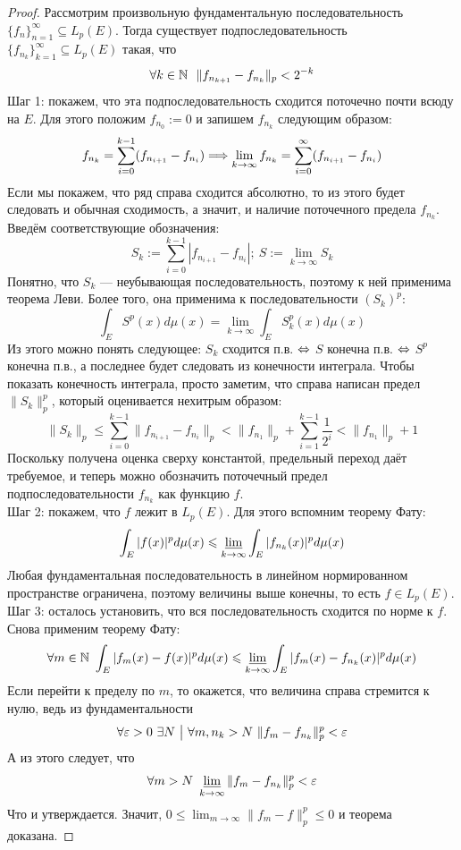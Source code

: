\begin{proof}
	Рассмотрим произвольную фундаментальную последовательность $\{f_n\}_{n = 1}^\infty \subseteq L_p(E)$. Тогда существует подпоследовательность $\{f_{n_k}\}_{k = 1}^\infty \subseteq L_p(E)$ такая, что
	\[
		\forall k \in \N\ \ \|f_{n_{k + 1}} - f_{n_k}\|_p < 2^{-k}
	\]
	Шаг 1: покажем, что эта подпоследовательность сходится поточечно почти всюду на $E$. Для этого положим $f_{n_0} := 0$ и запишем $f_{n_k}$ следующим образом:
	\[
		f_{n_k} = \sum_{i = 0}^{k - 1} (f_{n_{i + 1}} - f_{n_i}) \Lora \lim_{k \to \infty}f_{n_k} = \sum_{i = 0}^\infty (f_{n_{i + 1}} - f_{n_i})
	\]
	Если мы покажем, что ряд справа сходится абсолютно, то из этого будет следовать и обычная сходимость, а значит, и наличие поточечного предела $f_{n_k}$. Введём соответствующие обозначения:
	\[
		S_k := \sum_{i = 0}^{k - 1} |f_{n_{i + 1}} - f_{n_i}|; \ S := \lim_{k \to \infty} S_k
	\]
	Понятно, что $S_k$ --- неубывающая последовательность, поэтому к ней применима теорема Леви. Более того, она применима к последовательности $(S_k)^p$:
	\[
		\int_E S^p(x) d\mu(x) = \lim_{k \to \infty} \int_E S_k^p(x)d\mu(x)
	\]
	Из этого можно понять следующее: $S_k$ сходится п.в. $\Lra$ $S$ конечна п.в. $\Lra$ $S^p$ конечна п.в., а последнее будет следовать из конечности интеграла. Чтобы показать конечность интеграла, просто заметим, что справа написан предел $\|S_k\|_p^p$, который оценивается нехитрым образом:
	\[
		\|S_k\|_p \leq \sum_{i = 0}^{k - 1} \|f_{n_{i + 1}} - f_{n_i}\|_p < \|f_{n_1}\|_p + \sum_{i = 1}^{k - 1} \frac{1}{2^i} < \|f_{n_1}\|_p + 1
	\]
	Поскольку получена оценка сверху константой, предельный переход даёт требуемое, и теперь можно обозначить поточечный предел подпоследовательности $f_{n_k}$ как функцию $f$.\\
	Шаг 2: покажем, что $f$ лежит в $L_p(E)$. Для этого вспомним теорему Фату:
	\[
		\int_E |f(x)|^p d\mu(x) \leq \varliminf_{k \to \infty} \int_E |f_{n_k}(x)|^p d\mu(x)
	\]
	Любая фундаментальная последовательность в линейном нормированном пространстве ограничена, поэтому величины выше конечны, то есть $f \in L_p(E)$. \\
	Шаг 3: осталось установить, что вся последовательность сходится по норме к $f$. Снова применим теорему Фату:
	\[
		\forall m \in \N \ 
		\int_E |f_m(x) - f(x)|^p d\mu(x) \leq \varliminf_{k \to \infty} \int_E |f_m(x) - f_{n_k}(x)|^p d\mu(x)
	\]
	Если перейти к пределу по $m$, то окажется, что величина справа стремится к нулю, ведь из фундаментальности
	\[
		\forall \eps > 0 \ \exists N \such \forall m, n_k > N \ \|f_m - f_{n_k}\|_p^p < \eps
	\]
	А из этого следует, что
	\[
		\forall m > N \ \varliminf_{k \to \infty} \|f_m - f_{n_k}\|_p^p < \eps
	\]
	Что и утверждается. Значит, $0 \leq \lim_{m \to \infty} \|f_m - f\|_p^p \leq 0$ и теорема доказана.
\end{proof}